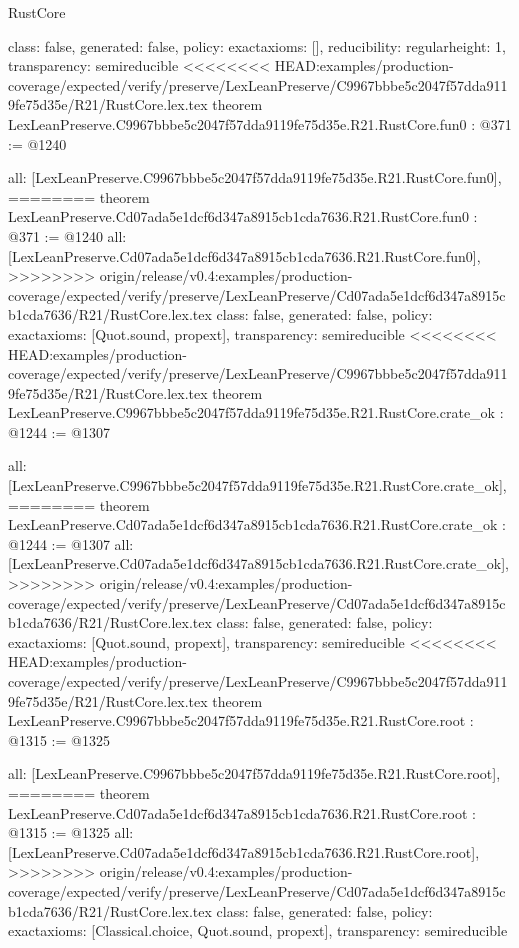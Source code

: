 \begin{lexlean}{RustCore}
\begin{coremodule}
{\begin{coremodule}
{{{  class: false,
  generated: false,
  policy: exact{axioms: []},
  reducibility: regular{height: 1},
  transparency: semireducible
}
<<<<<<<< HEAD:examples/production-coverage/expected/verify/preserve/LexLeanPreserve/C9967bbbe5c2047f57dda9119fe75d35e/R21/RustCore.lex.tex
theorem LexLeanPreserve.C9967bbbe5c2047f57dda9119fe75d35e.R21.RustCore.fun0 : @371 := @1240 {
  all: [LexLeanPreserve.C9967bbbe5c2047f57dda9119fe75d35e.R21.RustCore.fun0],
========
theorem LexLeanPreserve.Cd07ada5e1dcf6d347a8915cb1cda7636.R21.RustCore.fun0 : @371 := @1240 {
  all: [LexLeanPreserve.Cd07ada5e1dcf6d347a8915cb1cda7636.R21.RustCore.fun0],
>>>>>>>> origin/release/v0.4:examples/production-coverage/expected/verify/preserve/LexLeanPreserve/Cd07ada5e1dcf6d347a8915cb1cda7636/R21/RustCore.lex.tex
  class: false,
  generated: false,
  policy: exact{axioms: [Quot.sound, propext]},
  transparency: semireducible
}
<<<<<<<< HEAD:examples/production-coverage/expected/verify/preserve/LexLeanPreserve/C9967bbbe5c2047f57dda9119fe75d35e/R21/RustCore.lex.tex
theorem LexLeanPreserve.C9967bbbe5c2047f57dda9119fe75d35e.R21.RustCore.crate_ok : @1244 := @1307 {
  all: [LexLeanPreserve.C9967bbbe5c2047f57dda9119fe75d35e.R21.RustCore.crate_ok],
========
theorem LexLeanPreserve.Cd07ada5e1dcf6d347a8915cb1cda7636.R21.RustCore.crate_ok : @1244 := @1307 {
  all: [LexLeanPreserve.Cd07ada5e1dcf6d347a8915cb1cda7636.R21.RustCore.crate_ok],
>>>>>>>> origin/release/v0.4:examples/production-coverage/expected/verify/preserve/LexLeanPreserve/Cd07ada5e1dcf6d347a8915cb1cda7636/R21/RustCore.lex.tex
  class: false,
  generated: false,
  policy: exact{axioms: [Quot.sound, propext]},
  transparency: semireducible
}
<<<<<<<< HEAD:examples/production-coverage/expected/verify/preserve/LexLeanPreserve/C9967bbbe5c2047f57dda9119fe75d35e/R21/RustCore.lex.tex
theorem LexLeanPreserve.C9967bbbe5c2047f57dda9119fe75d35e.R21.RustCore.root : @1315 := @1325 {
  all: [LexLeanPreserve.C9967bbbe5c2047f57dda9119fe75d35e.R21.RustCore.root],
========
theorem LexLeanPreserve.Cd07ada5e1dcf6d347a8915cb1cda7636.R21.RustCore.root : @1315 := @1325 {
  all: [LexLeanPreserve.Cd07ada5e1dcf6d347a8915cb1cda7636.R21.RustCore.root],
>>>>>>>> origin/release/v0.4:examples/production-coverage/expected/verify/preserve/LexLeanPreserve/Cd07ada5e1dcf6d347a8915cb1cda7636/R21/RustCore.lex.tex
  class: false,
  generated: false,
  policy: exact{axioms: [Classical.choice, Quot.sound, propext]},
  transparency: semireducible
}

}}}}}
\end{coremodule}}
\end{coremodule}
\end{lexlean}
